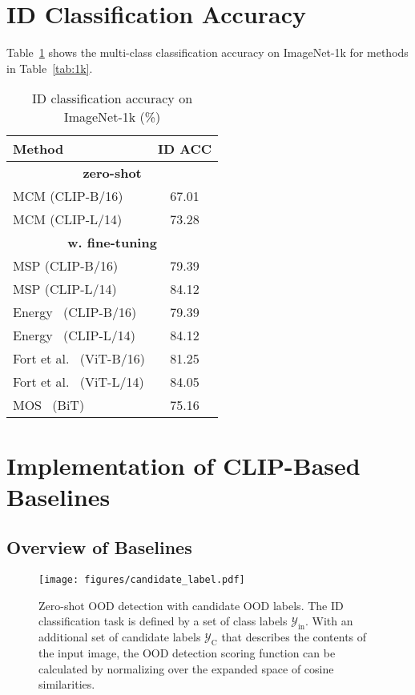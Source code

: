 \documentclass{article}
\begin{document}
\section{ID Classification Accuracy}
\label{sec:acc}
Table~\ref{tab:acc} shows the multi-class classification accuracy on ImageNet-1k for methods in Table~\ref{tab:1k}.
\begin{table}[hbt]
\caption{ID classification accuracy on ImageNet-1k (\%)}
\label{tab:acc}
\centering
\small
\begin{tabular}{lc}
\toprule
\textbf{Method} & \textbf{ID ACC}\\
\midrule
\multicolumn{2}{c}{\textbf{zero-shot }}   \\ 
MCM (CLIP-B/16) &67.01 \\
MCM (CLIP-L/14) & 73.28\\
\multicolumn{2}{c}{\textbf{w. fine-tuning }}   \\ 
MSP (CLIP-B/16) & 79.39 \\
MSP (CLIP-L/14) &84.12\\
Energy~\cite{liu2020energy} (CLIP-B/16)&79.39 \\
Energy~\cite{liu2020energy} (CLIP-L/14) & 84.12\\
Fort et al.~\cite{fort2021exploring} (ViT-B/16) &81.25\\ 
Fort et al.~\cite{fort2021exploring} (ViT-L/14) & 84.05\\
MOS~\cite{huang2021mos} (BiT) & 75.16 \\
\bottomrule
\end{tabular}
\end{table}

\section{Implementation of CLIP-Based Baselines}
\subsection{Overview of Baselines}
\begin{figure*}[thb]
  \centering
    \texttt{[image: figures/candidate\_label.pdf]}
\caption{\small Zero-shot OOD detection with candidate OOD labels. The ID classification task is defined by a set of class labels $\mathcal{Y}_\text{in}$. With an additional set of candidate labels  $\mathcal{Y}_\text{C}$ that describes the contents of the input image, the OOD detection scoring function can be calculated by normalizing over the expanded space of cosine similarities.}
\vspace{-0.3cm}
\label{fig:teaser_2}
\end{figure*}
\end{document}
